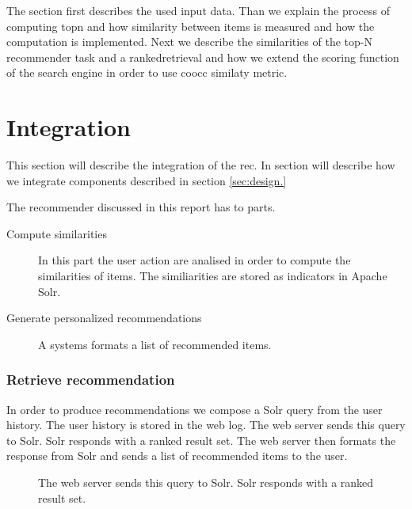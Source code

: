 The section first describes the used input data. Than we explain the process of computing \gls{topn} and how similarity between items is measured and how the computation is implemented. Next we describe the similarities of the top-N recommender task and a \gls{rankedretrieval} and how we extend the scoring function of the search engine in order to use \gls{coocc} similaty metric.







\section{Integration}
\label{sec:integration}

This section will describe the integration of the \gls{rec}. In section will describe how we integrate components described in section \ref{sec:design.}

The recommender discussed in this report has to parts.
\begin{description}
\item[Compute similarities] In this part the user action are analised in order to compute the similarities of items. The similiarities are stored as indicators in Apache Solr.
\item[Generate personalized recommendations] A systems formats a list of recommended items.
\end{description}


\subsubsection{Retrieve recommendation}

In order to produce recommendations we compose a Solr query from the user history. The user history is stored in the web log. The web server sends this query to Solr. Solr responds with a ranked result set. The web server then formats the response from Solr and sends a list of recommended items to the user.

\begin{figure}
\centering
{}
\caption{The web server sends this query to Solr. Solr responds with a ranked result set.}
\end{figure}

